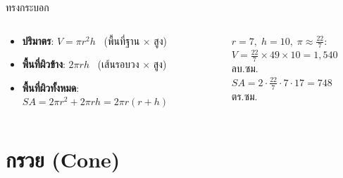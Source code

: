 \documentclass[11pt, aspectratio=169]{beamer}
\begin{document}
\begin{frame}{ทรงกระบอก}
  \begin{columns}[T]
      \centering
      \medskip\medskip\medskip\medskip\medskip\medskip

      \begin{explanation}[สูตร]
        \begin{itemize}
          \item \textbf{ปริมาตร}: $V = \pi r^2 h$ \ (พื้นที่ฐาน $\times$ สูง)
          \item \textbf{พื้นที่ผิวข้าง}: $2\pi rh$ \ (เส้นรอบวง $\times$ สูง)
          \item \textbf{พื้นที่ผิวทั้งหมด}: $SA = 2\pi r^2 + 2\pi rh = 2\pi r(r+h)$
        \end{itemize}
      \end{explanation}

      \begin{exambox}[ตัวอย่าง]
        $r=7,\;h=10,\;\pi \approx \frac{22}{7}$:
        \\ $V = \frac{22}{7} \times 49 \times 10 = 1{,}540$ ลบ.ซม.
        \\ $SA = 2 \cdot \frac{22}{7} \cdot 7 \cdot 17 = 748$ ตร.ซม.
      \end{exambox}
  \end{columns}
\end{frame}

\section{กรวย (Cone)}
\end{document}
